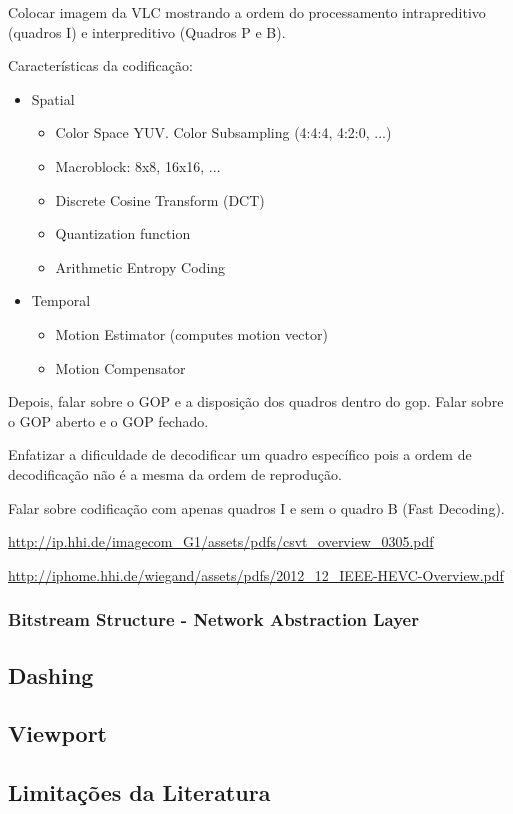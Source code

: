 Colocar imagem da VLC mostrando a ordem do processamento intrapreditivo (quadros I) e interpreditivo (Quadros P e B).

Características da codificação:

\begin{itemize}
	\item Spatial
	\begin{itemize}
		\item Color Space YUV. Color Subsampling (4:4:4, 4:2:0, ...) 
		\item Macroblock: 8x8, 16x16, ...
		\item Discrete Cosine Transform (DCT)
		\item Quantization function
		\item Arithmetic Entropy Coding
	\end{itemize}
	\item Temporal
	\begin{itemize}
		\item Motion Estimator (computes motion vector)
		\item Motion Compensator
	\end{itemize}
\end{itemize}
	
Depois, falar sobre o GOP e a disposição dos quadros dentro do gop. Falar sobre o GOP aberto e o GOP fechado.

Enfatizar a dificuldade de decodificar um quadro específico pois a ordem de decodificação não é a mesma da ordem de reprodução.

Falar sobre codificação com apenas quadros I e sem o quadro B (Fast Decoding).

\url{http://ip.hhi.de/imagecom_G1/assets/pdfs/csvt_overview_0305.pdf }

\url{http://iphome.hhi.de/wiegand/assets/pdfs/2012_12_IEEE-HEVC-Overview.pdf}

\subsubsection{Bitstream Structure - Network Abstraction Layer}
\subsection{Dashing}
\subsection{Viewport}
\subsection{Limitações da Literatura}
